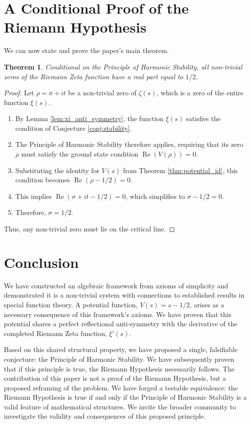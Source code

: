 \documentclass{amsart}
\theoremstyle{plain}
\newtheorem{theorem}{Theorem}[section]
\theoremstyle{definition}
\theoremstyle{remark}
\DeclareMathOperator{\re}{Re}
\begin{document}
\section{A Conditional Proof of the Riemann Hypothesis}
We can now state and prove the paper's main theorem.
\begin{theorem}
Conditional on the Principle of Harmonic Stability, all non-trivial zeros of the Riemann Zeta function have a real part equal to $1/2$. 
\end{theorem}
\begin{proof}
Let $\rho = \sigma + it$ be a non-trivial zero of $\zeta(s)$, which is a zero of the entire function $\xi(s)$. 
\begin{enumerate}
    \item By Lemma \ref{lem:xi_anti_symmetry}, the function $\xi(s)$ satisfies the condition of Conjecture \ref{conj:stability}.
    \item The Principle of Harmonic Stability therefore applies, requiring that its zero $\rho$ must satisfy the ground state condition $\re(V(\rho))=0$. 
    \item Substituting the identity for $V(s)$ from Theorem \ref{thm:potential_id}, this condition becomes $\re(\rho - 1/2) = 0$.
    \item This implies $\re(\sigma + it - 1/2) = 0$, which simplifies to $\sigma - 1/2 = 0$.
    \item Therefore, $\sigma = 1/2$.
\end{enumerate}
Thus, any non-trivial zero must lie on the critical line.
\end{proof}

\section{Conclusion}
We have constructed an algebraic framework from axioms of simplicity and demonstrated it is a non-trivial system with connections to established results in special function theory. A potential function, $V(s) = s - 1/2$, arises as a necessary consequence of this framework's axioms. We have proven that this potential shares a perfect reflectional anti-symmetry with the derivative of the completed Riemann Zeta function, $\xi'(s)$.

Based on this shared structural property, we have proposed a single, falsifiable conjecture: the Principle of Harmonic Stability. We have subsequently proven that if this principle is true, the Riemann Hypothesis necessarily follows. The contribution of this paper is not a proof of the Riemann Hypothesis, but a proposed reframing of the problem. We have forged a testable equivalence: the Riemann Hypothesis is true if and only if the Principle of Harmonic Stability is a valid feature of mathematical structures. We invite the broader community to investigate the validity and consequences of this proposed principle.
\end{document}

